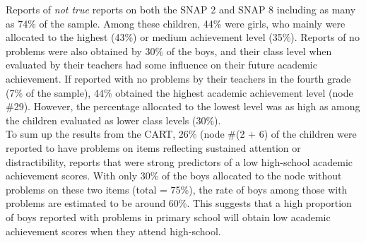 \documentclass[10pt,letterpaper]{article}
\begin{document}
Reports of \emph{not true} reports on both the SNAP 2 and SNAP 8 including as many as 74\% of the sample.  Among these children, 44\% were girls, who mainly were allocated to the highest (43\%) or medium achievement level (35\%).  Reports of no problems were also obtained by 30\% of the boys,  and their class level when evaluated by their teachers had some influence on their future academic achievement. If reported with no problems by their teachers in the fourth grade (7\% of the sample), 44\% obtained the highest academic achievement level  (node {\#29). However, the percentage allocated to the lowest level was as high as among the children evaluated as lower class levels (30\%). \\

 To sum up the results from the CART, 26\% (node \#(2 + 6) of the children were reported to have problems on items reflecting sustained attention or distractibility, reports that were strong predictors of a low high-school academic achievement scores. With only 30\% of the boys allocated to the node without problems on these two items (total = 75\%), the rate of boys among those with problems are estimated to be around 60\%. This suggests that a high proportion of boys reported with problems in primary school will obtain low academic achievement scores when they attend high-school. \\ 


}
\end{document}
